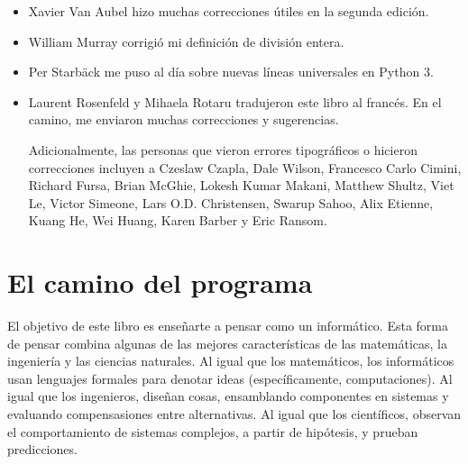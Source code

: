 \documentclass[10pt]{book}
\begin{document}
\begin{itemize}
\item Xavier Van Aubel hizo muchas correcciones útiles en la segunda
edición.

\item William Murray corrigió mi definición de división entera.

\item Per Starb{\"a}ck me puso al día sobre nuevas líneas universales en Python 3.

\item Laurent Rosenfeld y Mihaela Rotaru tradujeron este libro al francés.  En el camino, me enviaron muchas correcciones y sugerencias.


Adicionalmente, las personas que vieron errores tipográficos o hicieron correcciones incluyen a
Czeslaw Czapla, Dale Wilson, Francesco Carlo Cimini,
Richard Fursa, Brian McGhie, Lokesh Kumar Makani, Matthew Shultz, Viet
Le, Victor Simeone, Lars O.D. Christensen, Swarup Sahoo, Alix Etienne,
Kuang He, Wei Huang, Karen Barber y Eric Ransom.




\end{itemize}

\normalsize
\clearemptydoublepage

\begin{latexonly}

\tableofcontents

\clearemptydoublepage

\end{latexonly}

\mainmatter

\chapter{El camino del programa}

El objetivo de este libro es enseñarte a pensar como un informático. Esta forma
de pensar combina algunas de las mejores características de las matemáticas,
la ingeniería y las ciencias naturales.  Al igual que los matemáticos, los
informáticos usan lenguajes formales para denotar ideas (específicamente,
computaciones). Al igual que los ingenieros, diseñan cosas, ensamblando
componentes en sistemas y evaluando compensasiones entre alternativas.
Al igual que los científicos, observan el comportamiento de sistemas complejos,
a partir de hipótesis, y prueban predicciones.  
\end{document}
